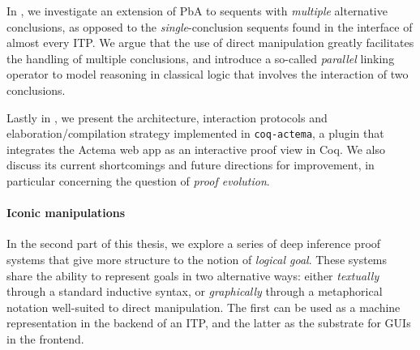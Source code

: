 In , we investigate an extension of PbA to sequents with
\emph{multiple} alternative conclusions, as opposed to the
\emph{single}-conclusion sequents found in the interface of almost every ITP. We
argue that the use of direct manipulation greatly facilitates the handling of
multiple conclusions, and introduce a so-called \emph{parallel} linking operator
to model reasoning in classical logic that involves the interaction of two
conclusions.

Lastly in , we present the architecture, interaction protocols and
elaboration/compilation strategy implemented in \texttt{coq-actema}, a plugin
that integrates the Actema web app as an interactive proof view in Coq. We also
discuss its current shortcomings and future directions for improvement, in
particular concerning the question of \emph{proof evolution}.

\paragraph{Iconic manipulations}
  
In the second part of this thesis, we explore a series of deep inference proof
systems that give more structure to the notion of \emph{logical goal}. These
systems share the ability to represent goals in two alternative ways: either
\emph{textually} through a standard inductive syntax, or \emph{graphically}
through a metaphorical notation well-suited to direct manipulation. The first
can be used as a machine representation in the backend of an ITP, and the latter
as the substrate for GUIs in the frontend.

